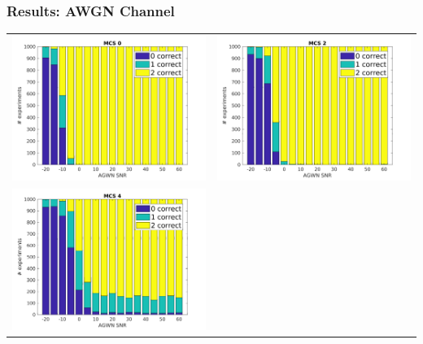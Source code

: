 \documentclass[accentcolor=tud8b,colorbacktitle]{tudbeamer}
\begin{document}
\begin{frame}
\frametitle{Results: AWGN Channel}
	\centering
	\vspace{-0.3cm}
	\begin{tabular}{cc}
		\includegraphics[height=0.52\textheight]{../../gfx/plots/awgn-mcs0} &
		\includegraphics[height=0.52\textheight]{../../gfx/plots/awgn-mcs2} \\
		\includegraphics[height=0.52\textheight]{../../gfx/plots/awgn-mcs4} &

\end{tabular}
\end{frame}
\end{document}
